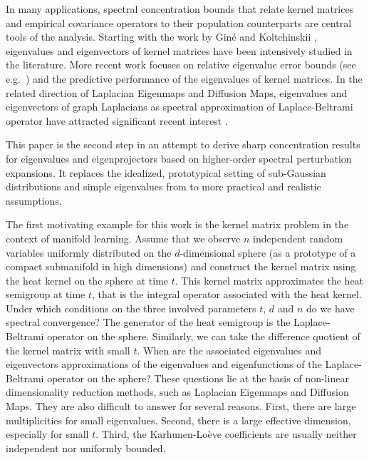 \documentclass[a4paper,11pt]{article} %
\numberwithin{equation}{section}
\theoremstyle{definition}
\theoremstyle{remark}
\theoremstyle{plain}
\begin{document}
In many applications, spectral concentration bounds that relate kernel matrices and empirical covariance operators to their population counterparts are central tools of the analysis. Starting with the work by Giné and Koltchinskii \cite{MR1781185,MR1652327}, eigenvalues and eigenvectors of kernel matrices have been intensively studied in the literature. More recent work focuses on relative eigenvalue error bounds (see e.g.~\cite{MR2274441,pmlr-v99-ostrovskii19a,BarzilaiShamir}) and the predictive performance of the eigenvalues of kernel matrices. In the related direction of Laplacian Eigenmaps and Diffusion Maps, eigenvalues and eigenvectors of graph Laplacians as spectral approximation of Laplace-Beltrami operator have attracted significant recent interest \cite{MR4130541,MR4393800,MR4548608,MR4452681,TLV25,CD25}. 

This paper is the second step in an attempt to derive sharp concentration results for eigenvalues and eigenprojectors based on higher-order spectral perturbation expansions.
It replaces the idealized, prototypical setting of sub-Gaussian distributions and simple eigenvalues from \cite{Wahl2026PertubationExpansionsI} to more practical and realistic assumptions.

The first motivating example for this work is the kernel matrix problem in the context of manifold learning. 
Assume that we observe $n$ independent random variables uniformly distributed on the $d$-dimensional sphere (as a prototype of a compact submanifold in high dimensions) and construct the kernel matrix using the heat kernel on the sphere at time $t$. 
This kernel matrix approximates the heat semigroup at time $t$, that is the integral operator associated with the heat kernel. 
Under which conditions on the three involved parameters $t$, $d$ and $n$ do we have spectral convergence? 
The generator of the heat semigroup is the Laplace-Beltrami operator on the sphere. 
Similarly, we can take the difference quotient of the kernel matrix with small $t$. 
When are the associated eigenvalues and eigenvectors approximations of the eigenvalues and eigenfunctions of the Laplace-Beltrami operator on the sphere? 
These questions lie at the basis of non-linear dimensionality reduction methods, such as Laplacian Eigenmaps and Diffusion Maps. 
They are also difficult to answer for several reasons. 
First, there are large multiplicities for small eigenvalues. 
Second, there is a large effective dimension, especially for small $t$. 
Third, the Karhunen-Loève coefficients are usually neither independent nor uniformly bounded.
\end{document}
